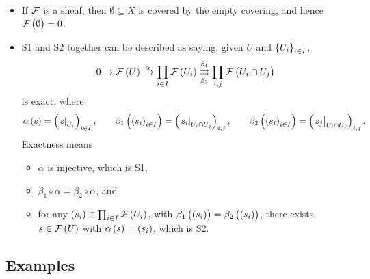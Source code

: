 \begin{remark*}
\hfill
\begin{itemize}
\item If $ \mathcal{F} $ is a sheaf, then $ \emptyset \subseteq X $ is covered by the empty covering, and hence $ \FFF\br{\emptyset} = 0 $.
\item S1 and S2 together can be described as saying, given $ U $ and $ \cbr{U_i}_{i \in I} $,
$$ 0 \to \FFF\br{U} \xrightarrow{\alpha} \prod_{i \in I} \FFF\br{U_i} \overset{\beta_1}{\underset{\beta_2}{\rightrightarrows}} \prod_{i, j} \FFF\br{U_i \cap U_j} $$
is exact, where
$$ \alpha\br{s} = \br{\eval{s}_{U_i}}_{i \in I}, \qquad \beta_1\br{\br{s_i}_{i \in I}} = \br{\eval{s_i}_{U_i \cap U_j}}_{i, j}, \qquad \beta_2\br{\br{s_i}_{i \in I}} = \br{\eval{s_j}_{U_i \cap U_j}}_{i, j}. $$
Exactness means
\begin{itemize}
\item $ \alpha $ is injective, which is S1,
\item $ \beta_1 \circ \alpha = \beta_2 \circ \alpha $, and
\item for any $ \br{s_i} \in \prod_{i \in I} \FFF\br{U_i} $, with $ \beta_1\br{\br{s_i}} = \beta_2\br{\br{s_i}} $, there exists $ s \in \FFF\br{U} $ with $ \alpha\br{s} = \br{s_i} $, which is S2.
\end{itemize}
\end{itemize}
\end{remark*}

\pagebreak

\subsection{Examples}


